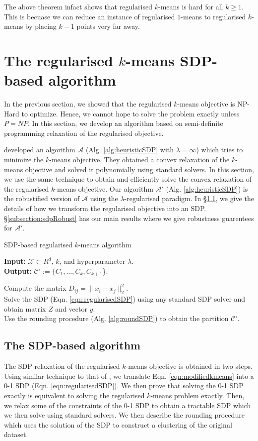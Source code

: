 \documentclass[12pt]{article}
\newcommand{\mc}{\mathcal}
\begin{document}
The above theorem infact shows that regularised $k$-means is hard for all $k \ge 1$. This is becuase we can reduce an instance of regularised $1$-means to regularised $k$-means by placing $k-1$ points very far away. 

\section{The regularised $k$-means SDP-based algorithm}
\label{section:heuristic}
In the previous section, we showed that the regularised $k$-means objective is NP-Hard to optimize. Hence, we cannot hope to solve the problem exactly unless $P=NP$. In this section, we develop an algorithm based on semi-definite programming relaxation of the regularised objective. 

\cite{peng2007approximating} developed an algorithm $\mc A$ (Alg. \ref{alg:heuristicSDP} with $\lambda = \infty$) which tries to minimize the $k$-means objective. They obtained a convex relaxation of the $k$-means objective and solved it polynomially using standard solvers. In this section, we use the same technique to obtain and efficiently solve the convex relaxation of the regularised $k$-means objective. Our algorithm $\mc A'$ (Alg. \ref{alg:heuristicSDP}) is the robustified version of $\mc A$ using the $\lambda$-regularised paradigm. In \S \ref{subsection:sdpAlg}, we give the details of how we transform the regularised objective into an SDP. \S \ref{subsection:sdpRobust} has our main results where we give robustness guarentees for $\mc A'$.    

\begin{algorithm}[t]
\caption{SDP-based regularised $k$-means algorithm}
\label{alg:heuristicSDP}
	\textbf{Input: }{ $\mc{X} \subset R^d$, $k$, and hyperparameter $\lambda$.} \\
	\textbf{Output: }{$\mc C' := \{C_1, \ldots, C_k, C_{k+1}$\}.}
	
	Compute the matrix $D_{ij} = \|x_i-x_j\|^2_2$.\\
	Solve the SDP (Eqn. \ref{eqn:regularisedSDP}) using any standard SDP solver and obtain matrix $Z$ and vector $y$.\\
	Use the rounding procedure (Alg. \ref{alg:roundSDP}) to obtain the partition $\mc C'$. 
\end{algorithm}

 
\subsection{The SDP-based algorithm}
\label{subsection:sdpAlg}
The SDP relaxation of the regularised $k$-means objective is obtained in two steps. Using similar technique to that of \cite{peng2007approximating}, we translate Eqn. \ref{eqn:modifiedkmeans} into a 0-1 SDP (Eqn. \ref{eqn:regularisedSDP}). We then prove that solving the 0-1 SDP exactly is equivalent to solving the regularised $k$-means problem exactly. Then, we relax some of the constraints of the 0-1 SDP to obtain a tractable SDP which we then solve using standard solvers. We then describe the rounding procedure which uses the solution of the SDP to construct a clustering of the original dataset. 
\end{document}
